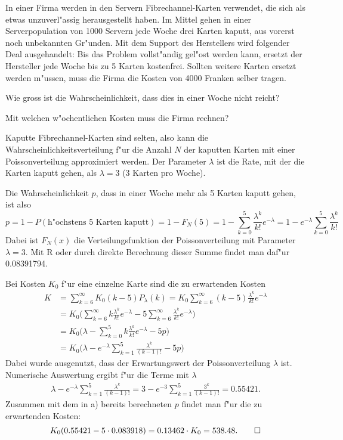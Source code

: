 In einer Firma werden in den Servern Fibrechannel-Karten verwendet,
die sich als etwas unzuverl"assig herausgestellt haben.
Im Mittel gehen in einer Serverpopulation von 1000 Servern jede Woche
drei Karten kaputt, aus vorerst noch unbekannten Gr"unden.
Mit dem Support des Herstellers wird folgender Deal
ausgehandelt: Bis das Problem vollst"andig gel"ost werden kann, 
ersetzt der Hersteller jede Woche bis zu 5 Karten kostenfrei.
Sollten weitere Karten ersetzt werden m"ussen, muss die Firma
die Kosten von 4000 Franken selber tragen.
\begin{teilaufgaben}
\item
Wie gross ist die Wahrscheinlichkeit, dass dies in einer Woche nicht
reicht?
\item
Mit welchen w"ochentlichen Kosten muss die Firma rechnen?
\end{teilaufgaben}

\begin{loesung}
Kaputte Fibrechannel-Karten sind selten, also kann
die Wahrscheinlichkeitsverteilung f"ur die Anzahl $N$ der kaputten Karten
mit einer Poissonverteilung approximiert werden. Der Parameter $\lambda$
ist die Rate, mit der die Karten kaputt gehen, als $\lambda=3$ (3 Karten
pro Woche).
\begin{teilaufgaben}
\item
Die Wahrscheinlichkeit $p$, dass in einer Woche mehr als 5 Karten kaputt
gehen, ist also
\[
p=1-P(\text{h"ochstens 5 Karten kaputt})=1-F_N(5)
=1-\sum_{k=0}^5\frac{\lambda^k}{k!}e^{-\lambda}
=1-e^{-\lambda}\sum_{k=0}^5\frac{\lambda^k}{k!}
\]
Dabei ist $F_N(x)$ die Verteilungsfunktion der Poissonverteilung mit
Parameter $\lambda=3$. Mit R oder durch direkte Berechnung dieser
Summe findet man daf"ur 0.08391794.
\item
Bei Kosten $K_0$ f"ur eine einzelne Karte sind die zu erwartenden Kosten 
\begin{align*}
K
&=
\sum_{k=6}^\infty K_0(k-5)P_\lambda(k)
=
K_0
\sum_{k=6}^\infty (k-5)\frac{\lambda^k}{k!}e^{-\lambda}
\\
&=
K_0\biggl(
\sum_{k=6}^\infty k\frac{\lambda^k}{k!}e^{-\lambda}
-5\sum_{k=6}^\infty \frac{\lambda^k}{k!}e^{-\lambda}
\biggr)
\\
&=
K_0\biggl(
\lambda-\sum_{k=0}^5k\frac{\lambda^k}{k!}e^{-\lambda}
-5p
\biggr)
\\
&=
K_0\biggl(\lambda- e^{-\lambda}\sum_{k=1}^5\frac{\lambda^k}{(k-1)!} -5p\biggr)
\end{align*}
Dabei wurde ausgenutzt, dass der Erwartungswert der Poissonverteilung
$\lambda$ ist.
Numerische Auswertung ergibt f"ur die Terme mit $\lambda$
\begin{align*}
\lambda-e^{-\lambda}\sum_{k=1}^5\frac{\lambda^k}{(k-1)!}
=
3-e^{-3}\sum_{k=1}^5\frac{3^k}{(k-1)!}
=0.55421.
\end{align*}
Zusammen mit dem in a) bereits berechneten $p$ findet man f"ur die
zu erwartenden Kosten:
\[
K_0(0.55421 - 5\cdot 0.083918)=0.13462\cdot K_0 = 538.48.
\qedhere
\]
\end{teilaufgaben}
\end{loesung}
